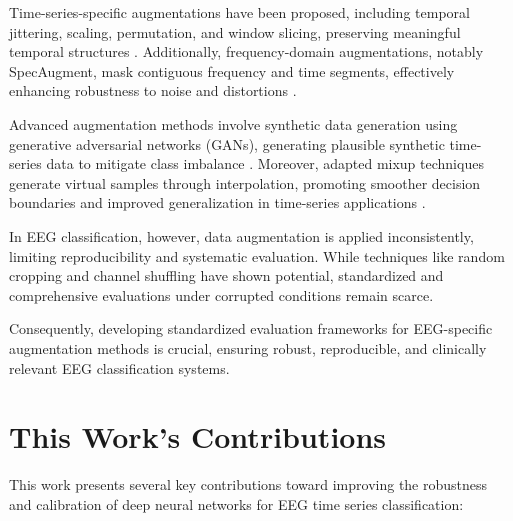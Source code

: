 Time-series-specific augmentations have been proposed, including temporal jittering, scaling, permutation, and window slicing, preserving meaningful temporal structures \cite{iwana2021empirical}. Additionally, frequency-domain augmentations, notably SpecAugment, mask contiguous frequency and time segments, effectively enhancing robustness to noise and distortions \cite{spectral_aug}.

Advanced augmentation methods involve synthetic data generation using generative adversarial networks (GANs), generating plausible synthetic time-series data to mitigate class imbalance \cite{esteban2017realvalued}. Moreover, adapted mixup techniques generate virtual samples through interpolation, promoting smoother decision boundaries and improved generalization in time-series applications \cite{um2017data}.

In EEG classification, however, data augmentation is applied inconsistently, limiting reproducibility and systematic evaluation. While techniques like random cropping and channel shuffling have shown potential, standardized and comprehensive evaluations under corrupted conditions remain scarce.

Consequently, developing standardized evaluation frameworks for EEG-specific augmentation methods is crucial, ensuring robust, reproducible, and clinically relevant EEG classification systems.


\section{This Work's Contributions}
This work presents several key contributions toward improving the robustness and calibration of deep neural networks for EEG time series classification:

